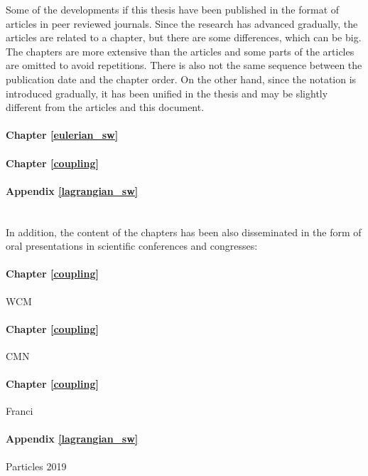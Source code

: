 Some of the developments if this thesis have been published in the format of articles in peer reviewed journals. Since the research has advanced gradually, the articles are related to a chapter, but there are some differences, which can be big.
The chapters are more extensive than the articles and some parts of the articles are omitted to avoid repetitions.
There is also not the same sequence between the publication date and the chapter order.
On the other hand, since the notation is introduced gradually, it has been unified in the thesis and may be slightly different from the articles and this document.

\paragraph{Chapter \ref{eulerian_sw}} 
\paragraph{Chapter \ref{coupling}} 
\paragraph{Appendix \ref{lagrangian_sw}} 
\\

In addition, the content of the chapters has been also disseminated in the form of oral presentations in scientific conferences and congresses:

\paragraph{Chapter \ref{coupling}} WCM
\paragraph{Chapter \ref{coupling}} CMN
\paragraph{Chapter \ref{coupling}} Franci
\paragraph{Appendix \ref{lagrangian_sw}} Particles 2019




